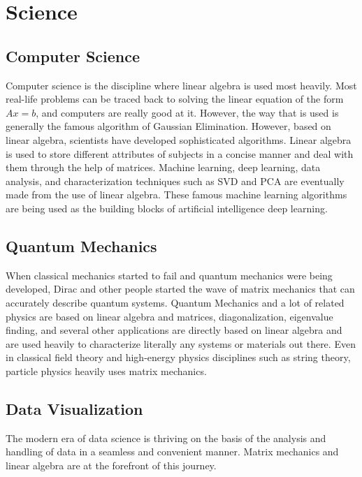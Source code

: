 \section{Science} \label{sec:Science}

\subsection{Computer Science}
Computer science is the discipline where linear algebra is used most heavily. Most real-life problems can be traced back to solving the linear equation of the form $Ax=b$, and computers are really good at it. However, the way that is used is generally the famous algorithm of Gaussian Elimination. However, based on linear algebra, scientists have developed sophisticated algorithms. Linear algebra is used to store different attributes of subjects in a concise manner and deal with them through the help of matrices. Machine learning, deep learning, data analysis, and characterization techniques such as SVD and PCA are eventually made from the use of linear algebra. These famous machine learning algorithms are being used as the building blocks of artificial intelligence deep learning.

\subsection{Quantum Mechanics}

When classical mechanics started to fail and quantum mechanics were being developed, Dirac and other people started the wave of matrix mechanics that can accurately describe quantum systems. Quantum Mechanics and a lot of related physics are based on linear algebra and matrices, diagonalization, eigenvalue finding, and several other applications are directly based on linear algebra and are used heavily to characterize literally any systems or materials out there. Even in classical field theory and high-energy physics disciplines such as string theory, particle physics heavily uses matrix mechanics.

\subsection{Data Visualization}

The modern era of data science is thriving on the basis of the analysis and handling of data in a seamless and convenient manner. Matrix mechanics and linear algebra are at the forefront of this journey. 



